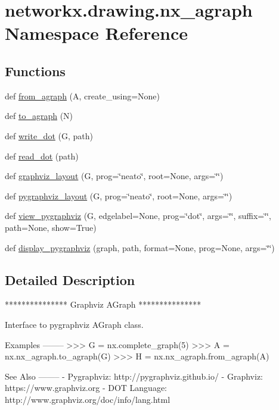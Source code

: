 \hypertarget{namespacenetworkx_1_1drawing_1_1nx__agraph}{}\section{networkx.\+drawing.\+nx\+\_\+agraph Namespace Reference}
\label{namespacenetworkx_1_1drawing_1_1nx__agraph}
\subsection*{Functions}
\begin{DoxyCompactItemize}
\item 
def \hyperlink{namespacenetworkx_1_1drawing_1_1nx__agraph_a594c52da2133757db464d2e5c5e5c0e1}{from\+\_\+agraph} (A, create\+\_\+using=None)
\item 
def \hyperlink{namespacenetworkx_1_1drawing_1_1nx__agraph_ab5d37a809c4d63abbbd0b9b386ea895f}{to\+\_\+agraph} (N)
\item 
def \hyperlink{namespacenetworkx_1_1drawing_1_1nx__agraph_a6ee401580d5f709da9ade2cb063e822b}{write\+\_\+dot} (G, path)
\item 
def \hyperlink{namespacenetworkx_1_1drawing_1_1nx__agraph_af36a72c8a546f317a65df178fbc08c39}{read\+\_\+dot} (path)
\item 
def \hyperlink{namespacenetworkx_1_1drawing_1_1nx__agraph_a02ed5ceb36a0fb5a7ce9321472854d7d}{graphviz\+\_\+layout} (G, prog=\char`\"{}neato\char`\"{}, root=None, args=\char`\"{}\char`\"{})
\item 
def \hyperlink{namespacenetworkx_1_1drawing_1_1nx__agraph_a0fec68f59eb84649dcb77309028365bc}{pygraphviz\+\_\+layout} (G, prog=\char`\"{}neato\char`\"{}, root=None, args=\char`\"{}\char`\"{})
\item 
def \hyperlink{namespacenetworkx_1_1drawing_1_1nx__agraph_a9e527c9027186eeef0d34b2768288904}{view\+\_\+pygraphviz} (G, edgelabel=None, prog=\char`\"{}dot\char`\"{}, args=\char`\"{}\char`\"{}, suffix=\char`\"{}\char`\"{}, path=None, show=True)
\item 
def \hyperlink{namespacenetworkx_1_1drawing_1_1nx__agraph_a96c4087e9d8bfdc5dd97915c37b0feb1}{display\+\_\+pygraphviz} (graph, path, format=None, prog=None, args=\char`\"{}\char`\"{})
\end{DoxyCompactItemize}


\subsection{Detailed Description}
\begin{DoxyVerb}***************
Graphviz AGraph
***************

Interface to pygraphviz AGraph class.

Examples
--------
>>> G = nx.complete_graph(5)
>>> A = nx.nx_agraph.to_agraph(G)
>>> H = nx.nx_agraph.from_agraph(A)

See Also
--------
 - Pygraphviz: http://pygraphviz.github.io/
 - Graphviz:      https://www.graphviz.org
 - DOT Language:  http://www.graphviz.org/doc/info/lang.html
\end{DoxyVerb}
 

